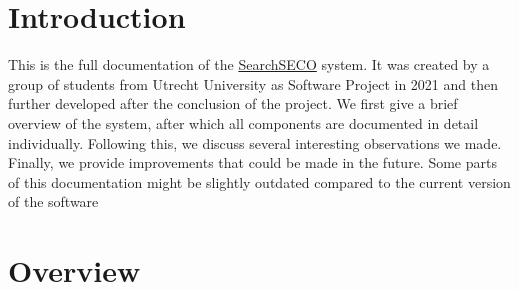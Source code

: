 \documentclass{article}
\begin{document}


\restoregeometry

\section{Introduction}
This is the full documentation of the \href{https://github.com/orgs/SecureSECO/teams/searchseco/repositories}{SearchSECO} system. It was created by a group of students from Utrecht University as Software Project in 2021 and then further developed after the conclusion of the project. We first give a brief overview of the system, after which all components are documented in detail individually. Following this, we discuss several interesting observations we made. Finally, we provide improvements that could be made in the future. Some parts of this documentation might be slightly outdated compared to the current version of the software\\




\clearpage
\tableofcontents
\clearpage

\section{Overview}
\end{document}
